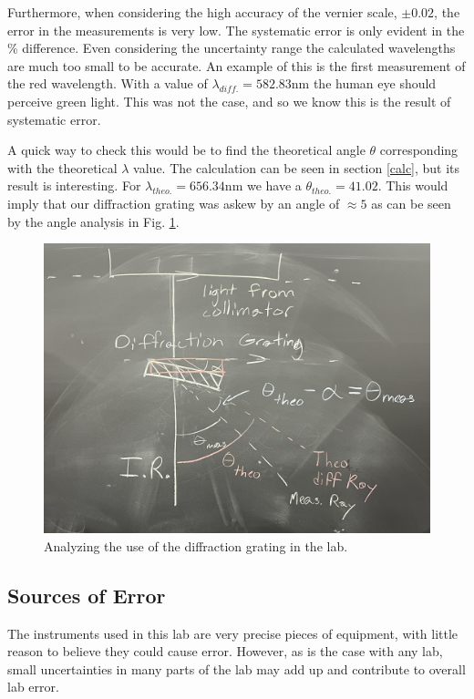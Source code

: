 \documentclass[letterpaper,11pt] {article}
\begin{document}
Furthermore, when considering the high accuracy of the vernier scale, $\pm 0.02$\textdegree\text{}, the error in the measurements is very low. The systematic error is only evident in the \% difference. Even considering the uncertainty range the calculated wavelengths are much too small to be accurate. An example of this is the first measurement of the red wavelength. With a value of $\lambda_{diff.}=582.83$nm the human eye should perceive green light. This was not the case, and so we know this is the result of systematic error. 

A quick way to check this would be to find the theoretical angle $\theta$ corresponding with the theoretical $\lambda$ value. The calculation can be seen in section \ref{calc}, but its result is interesting. For $\lambda_{theo.} = 656.34$nm we have a $\theta_{theo.}=41.02$\textdegree\text{}. This would imply that our diffraction grating was askew by an angle of $\approx5$\textdegree\text{} as can be seen by the angle analysis in Fig. \ref{askew}.

\begin{figure}[H]
        \centering \includegraphics[width=0.8\columnwidth]{H-Spectrum Lab photos/IMG_0701.jpg}
        \caption{\label{askew}Analyzing the use of the diffraction grating in the lab.
        }
\end{figure}


\subsection{Sources of Error}

The instruments used in this lab are very precise pieces of equipment, with little reason to believe they could cause error. However, as is the case with any lab, small uncertainties in many parts of the lab may add up and contribute to overall lab error. 
\end{document}
